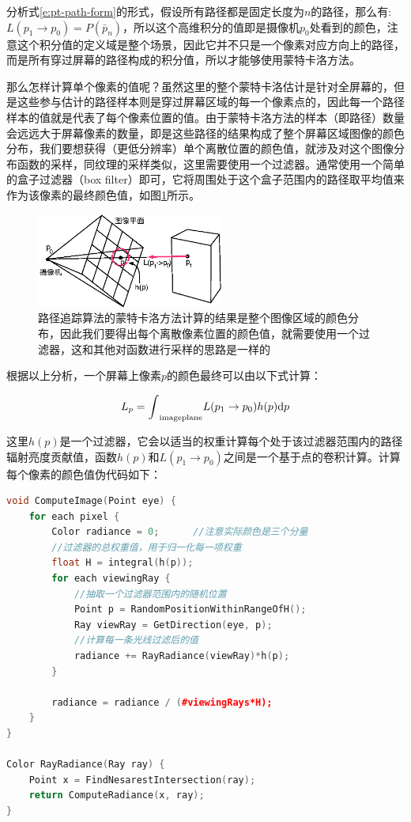 分析式\ref{e:pt-path-form}的形式，假设所有路径都是固定长度为$n$的路径，那么有: $L(p_1\to p_0)=P(\bar{p}_n)$，所以这个高维积分的值即是摄像机$p_0$处看到的颜色，注意这个积分值的定义域是整个场景，因此它并不只是一个像素对应方向上的路径，而是所有穿过屏幕的路径构成的积分值，所以才能够使用蒙特卡洛方法。

那么怎样计算单个像素的值呢？虽然这里的整个蒙特卡洛估计是针对全屏幕的，但是这些参与估计的路径样本则是穿过屏幕区域的每一个像素点的，因此每一个路径样本的值就是代表了每个像素位置的值。由于蒙特卡洛方法的样本（即路径）数量会远远大于屏幕像素的数量，即是这些路径的结果构成了整个屏幕区域图像的颜色分布，我们要想获得（更低分辨率）单个离散位置的颜色值，就涉及对这个图像分布函数的采样，同纹理的采样类似，这里需要使用一个过滤器。通常使用一个简单的盒子过滤器（box filter）即可，它将周围处于这个盒子范围内的路径取平均值来作为该像素的最终颜色值，如图\ref{f:pt-ray-set-up}所示。

\begin{figure}
	\sidecaption
	\includegraphics[width=0.55\textwidth]{figures/pt/ray-set-up}
	\caption{路径追踪算法的蒙特卡洛方法计算的结果是整个图像区域的颜色分布，因此我们要得出每个离散像素位置的颜色值，就需要使用一个过滤器，这和其他对函数进行采样的思路是一样的}
	\label{f:pt-ray-set-up}
\end{figure}

根据以上分析，一个屏幕上像素$p$的颜色最终可以由以下式计算：

\begin{equation}
	L_p={\rm \int}_{\rm imageplane}L(p_1\to p_0)h(p){\rm d}p
\end{equation}

这里$h(p)$是一个过滤器，它会以适当的权重计算每个处于该过滤器范围内的路径辐射亮度贡献值，函数$h(p)$和$L(p_1\to p_0)$之间是一个基于点的卷积计算。计算每个像素的颜色值伪代码如下：

\begin{lstlisting}[language=C++,mathescape]
void ComputeImage(Point eye) {
	for each pixel {
		Color radiance = 0;      //注意实际颜色是三个分量
		//过滤器的总权重值，用于归一化每一项权重
		float H = integral(h(p)); 
		for each viewingRay {
			//抽取一个过滤器范围内的随机位置
			Point p = RandomPositionWithinRangeOfH(); 
			Ray viewRay = GetDirection(eye, p);
			//计算每一条光线过滤后的值
			radiance += RayRadiance(viewRay)*h(p); 
		}
			
		radiance = radiance / (#viewingRays*H);
	}
}
	
Color RayRadiance(Ray ray) {
	Point x = FindNesarestIntersection(ray);
	return ComputeRadiance(x, ray);
}
\end{lstlisting}



